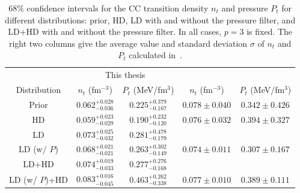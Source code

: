 \begin{table}[!t]
\begin{center}
\begin{tabular}{ccccc} 
  \toprule
  \toprule
  & \multicolumn{2}{c}{This thesis} & 
  \multicolumn{2}{c}{\cite{Carreau2019cc}}\\
  Distribution & $n_t$ (fm$^{-3}$) & $P_t$ (MeV/fm$^3$) & $n_t$
  (fm$^{-3}$) & $P_t$ (MeV/fm$^3$)\\
  \midrule
  Prior & $0.062_{-0.036}^{+0.028}$ & $0.225_{-0.167}^{+0.379}$ & $0.078\pm
  0.040$ & $0.342\pm 0.426$\\
  HD & $0.059_{-0.029}^{+0.023}$ & $0.190_{-0.120}^{+0.232}$ & $0.076\pm 0.032$
     & $0.394\pm 0.327$\\ 
  LD & $0.073_{-0.032}^{+0.025}$ & $0.281_{-0.179}^{+0.478}$ & &\\ 
  LD (w/ $P$) & $0.068_{-0.021}^{+0.021}$ & $0.263_{-0.149}^{+0.302}$ & $0.074
  \pm 0.011$ & $0.307\pm 0.167$\\ 
  LD+HD & $0.074_{-0.033}^{+0.019}$ & 
  $0.277_{-0.168}^{+0.276}$\\ 
  LD (w/ $P$)+HD & $0.083_{-0.045}^{+0.016}$ & $0.463_{-0.338}^{+0.262}$ & 
  $0.077\pm 0.010$ & $0.389\pm 0.111$\\ 
  \bottomrule
  \bottomrule
\end{tabular}
\end{center}
\caption[$68\%$ confidence intervals for the crust-core transition density and
pressure for different filters]{$68\%$ confidence intervals for the CC
transition density $n_t$ and pressure $P_t$ for different distributions: prior, 
HD, LD with and without the pressure filter, {and LD+HD with and without 
the pressure filter.} In all cases, $p=3$ is fixed. {The right two columns 
give the average value and standard deviation $\sigma$ of $n_t$ and $P_t$
calculated in~\cite{Carreau2019cc}.}}\label{table:ntpt}
\end{table}

